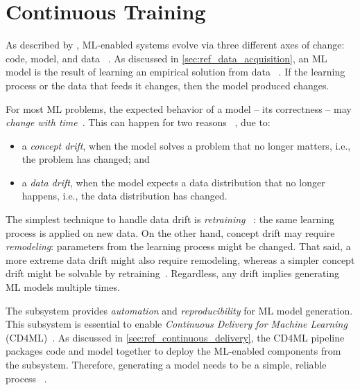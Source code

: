   \section{Continuous Training}
  \label{sec:ref_continuous_training}

  As described by \citeauthor{Sato2019ContinuousLearning}, ML-enabled
  systems evolve via three different axes of change: code, model, and data%
  ~\parencite{Sato2019ContinuousLearning}.
  As discussed in \cref{sec:ref_data_acquisition}, an ML model
  is the result of learning an empirical solution from data%
  ~\parencite{Abu-Mostafa2012LearningData}.
  If the learning process or the data that feeds it changes,
  then the model produced changes.

  For most ML problems, the expected behavior of a model -- its correctness --
  may \emph{change with time}~\parencite{Burkov2020MachineEngineering,
  Hulten2018BuildingEngineering}. This can happen for two reasons%
  ~\parencite{Dhinakaran2019MachineAI,Ozkaya2020WhatSystems,
  Wilson2022MachineAction}, due to:
  \begin{itemize}
      \item a \emph{concept drift}, when the model solves a problem
            that no longer matters, i.e., the problem has changed; and
      \item a \emph{data drift}, when the model expects a data distribution
            that no longer happens, i.e., the data distribution has changed.
  \end{itemize}

  The simplest technique to handle data drift is \emph{retraining}%
  ~\parencite{Kreuzberger2023MachineArchitecture,Lakshmanan2020MachineMLOps}:
  the same learning process is applied on new data. On the other hand,
  concept drift may require \emph{remodeling}: parameters from the learning
  process might be changed. That said, a more extreme data drift might also
  require remodeling, whereas a simpler concept drift might be solvable by
  retraining~\parencite{Wilson2022MachineAction}. Regardless, any drift
  implies generating ML models multiple times.

  The  subsystem provides
  \emph{automation} and \emph{reproducibility} for ML model generation.
  This subsystem is essential to enable \emph{Continuous Delivery
  for Machine Learning} (CD4ML)~\parencite{Sato2019ContinuousLearning}.
  As discussed in \cref{sec:ref_continuous_delivery}, the CD4ML pipeline
  packages code and model together to deploy the ML-enabled components
  from the  subsystem. Therefore, generating a
  model needs to be a simple, reliable process%
  ~\parencite{Sato2019ContinuousLearning}.

